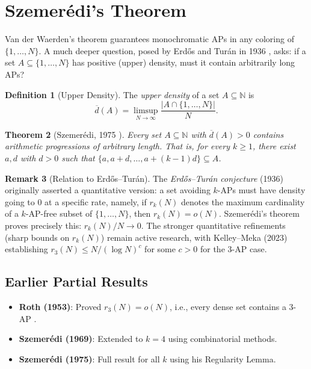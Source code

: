 \documentclass[12pt,a4paper]{amsart}
\newtheorem{theorem}{Theorem}[section]
\theoremstyle{definition}
\newtheorem{definition}[theorem]{Definition}
\newtheorem{remark}[theorem]{Remark}
\newcommand{\N}{\mathbb{N}}
\begin{document}
\section{Szemer\'edi's Theorem}\label{sec:szemeredi}

Van der Waerden's theorem guarantees monochromatic APs in any coloring of
$\{1,\ldots,N\}$. A much deeper question, posed by Erd\H{o}s and Tur\'an in 1936
\cite{ErdosTuran1936}, asks: if a set $A \subseteq \{1,\ldots,N\}$ has positive
(upper) density, must it contain arbitrarily long APs?

\begin{definition}[Upper Density]
The \emph{upper density} of a set $A \subseteq \N$ is
\[
  \overline{d}(A) = \limsup_{N \to \infty} \frac{|A \cap \{1,\ldots,N\}|}{N}.
\]
\end{definition}

\begin{theorem}[Szemer\'edi, 1975 \cite{Szemeredi1975}]\label{thm:szemeredi}
Every set $A \subseteq \N$ with $\overline{d}(A) > 0$ contains arithmetic progressions
of arbitrary length. That is, for every $k \geq 1$, there exist $a, d$ with $d > 0$
such that $\{a, a+d, \ldots, a+(k-1)d\} \subseteq A$.
\end{theorem}

\begin{remark}[Relation to Erd\H{o}s--Tur\'an]
The \emph{Erd\H{o}s--Tur\'an conjecture} (1936) originally asserted a quantitative
version: a set avoiding $k$-APs must have density going to $0$ at a specific rate,
namely, if $r_k(N)$ denotes the maximum cardinality of a $k$-AP-free subset of
$\{1,\ldots,N\}$, then $r_k(N) = o(N)$.
Szemer\'edi's theorem proves precisely this: $r_k(N)/N \to 0$. The stronger
quantitative refinements (sharp bounds on $r_k(N)$) remain active research,
with Kelley--Meka (2023) establishing $r_3(N) \leq N / (\log N)^{c}$ for some
$c > 0$ for the $3$-AP case.
\end{remark}

\subsection{Earlier Partial Results}

\begin{itemize}
\item \textbf{Roth (1953)}: Proved $r_3(N) = o(N)$, i.e., every dense set contains
  a $3$-AP \cite{Roth1953}.
\item \textbf{Szemer\'edi (1969)}: Extended to $k=4$ using combinatorial methods.
\item \textbf{Szemer\'edi (1975)}: Full result for all $k$ using his Regularity Lemma.
\end{itemize}
\end{document}
